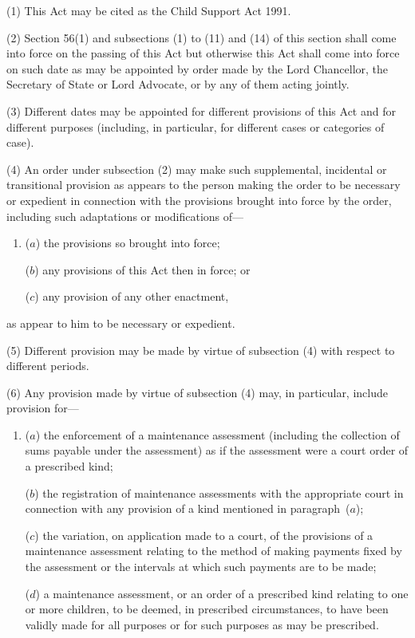 \documentclass[12pt,a4paper]{article}
\begin{document}
(1) This Act may be cited as the Child Support Act 1991.

(2) Section 56(1)  and subsections (1)  to (11)  and (14)  of this section shall come into force on the passing of this Act but otherwise this Act shall come into force on such date as may be appointed by order made by the Lord Chancellor, the Secretary of State or Lord Advocate, or by any of them acting jointly.

(3) Different dates may be appointed for different provisions of this Act and for different purposes (including, in particular, for different cases or categories of case).

(4) An order under subsection (2)  may make such supplemental, incidental or transitional provision as appears to the person making the order to be necessary or expedient in connection with the provisions brought into force by the order, including such adaptations or modifications of—
\begin{enumerate}\item[]
($a$) the provisions so brought into force;

($b$) any provisions of this Act then in force; or

($c$) any provision of any other enactment,
\end{enumerate}
as appear to him to be necessary or expedient.

(5) Different provision may be made by virtue of subsection (4)  with respect to different periods.

(6) Any provision made by virtue of subsection (4)  may, in particular, include provision for—
\begin{enumerate}\item[]
($a$) the enforcement of a maintenance assessment (including the collection of sums payable under the assessment) as if the assessment were a court order of a prescribed kind;

($b$) the registration of maintenance assessments with the appropriate court in connection with any provision of a kind mentioned in paragraph~($a$);

($c$) the variation, on application made to a court, of the provisions of a maintenance assessment relating to the method of making payments fixed by the assessment or the intervals at which such payments are to be made;

($d$) a maintenance assessment, or an order of a prescribed kind relating to one or more children, to be deemed, in prescribed circumstances, to have been validly made for all purposes or for such purposes as may be prescribed.
\end{enumerate}
\end{document}
